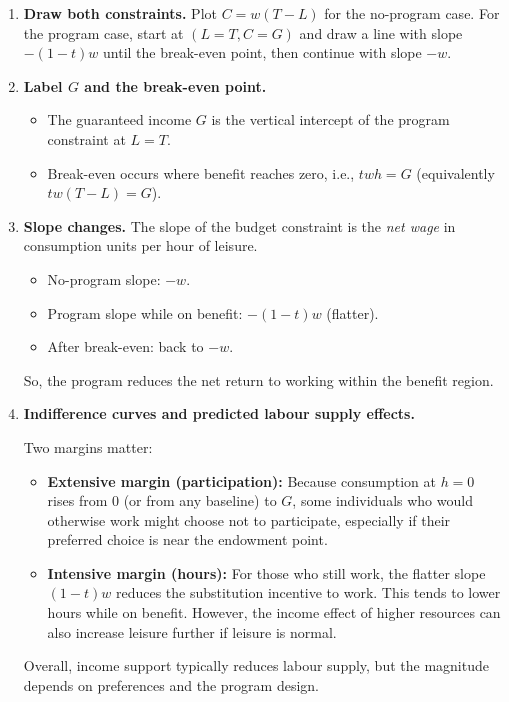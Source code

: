 \documentclass[12pt]{article}
\begin{document}
\begin{enumerate}
\item \textbf{Draw both constraints.} 
Plot $C=w(T-L)$ for the no-program case. For the program case, start at $(L=T,C=G)$ and draw a line with slope $-(1-t)w$ until the break-even point, then continue with slope $-w$.

\item \textbf{Label $G$ and the break-even point.}
\begin{itemize}
\item The guaranteed income $G$ is the vertical intercept of the program constraint at $L=T$.
\item Break-even occurs where benefit reaches zero, i.e., $twh=G$ (equivalently $t w(T-L)=G$).
\end{itemize}

\item \textbf{Slope changes.} The slope of the budget constraint is the \emph{net wage} in consumption units per hour of leisure.
\begin{itemize}
\item No-program slope: $-w$.
\item Program slope while on benefit: $-(1-t)w$ (flatter).
\item After break-even: back to $-w$.
\end{itemize}
So, the program reduces the net return to working within the benefit region.

\item \textbf{Indifference curves and predicted labour supply effects.}

Two margins matter:
\begin{itemize}
\item \textbf{Extensive margin (participation):} Because consumption at $h=0$ rises from $0$ (or from any baseline) to $G$, some individuals who would otherwise work might choose not to participate, especially if their preferred choice is near the endowment point.
\item \textbf{Intensive margin (hours):} For those who still work, the flatter slope $(1-t)w$ reduces the substitution incentive to work. This tends to lower hours while on benefit. However, the income effect of higher resources can also increase leisure further if leisure is normal.
\end{itemize}
Overall, income support typically reduces labour supply, but the magnitude depends on preferences and the program design.
\end{enumerate}
\end{document}
